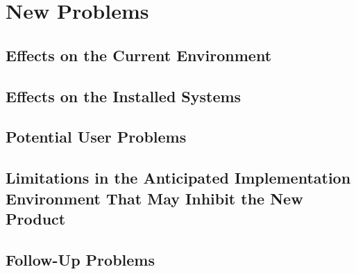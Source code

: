 \section{New Problems}
\subsection{Effects on the Current Environment}
\subsection{Effects on the Installed Systems}
\subsection{Potential User Problems}
\subsection{Limitations in the Anticipated Implementation Environment That May Inhibit the New Product}
\subsection{Follow-Up Problems}